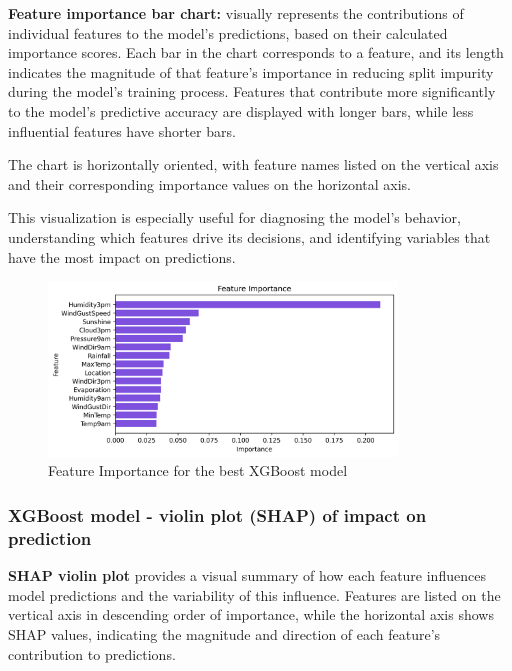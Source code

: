 \documentclass{article}%
\begin{document}
        \textbf{Feature importance bar chart:} visually represents the contributions of individual features to the model's predictions, 
        based on their calculated importance scores. Each bar in the chart corresponds to a feature, and its length indicates the magnitude of 
        that feature's importance in reducing split impurity during the model's training process. Features that contribute more significantly to 
        the model's predictive accuracy are displayed with longer bars, while less influential features have shorter bars.

        \hspace{20px}The chart is horizontally oriented, with feature names listed on the vertical axis and their corresponding importance values on the horizontal axis.

        \hspace{20px}This visualization is especially useful for diagnosing the model's behavior, understanding which features drive its decisions, 
        and identifying variables that have the most impact on predictions.\\
        \newline


\begin{figure}[h!]%
\centering%
\includegraphics[width=350px]{XAI/XGBoost/feature_importance.png}%
\caption{Feature Importance for the best XGBoost model}%
\end{figure}

%
\newpage%
\subsubsection{XGBoost model {-} violin plot (SHAP) of impact on prediction}%
\label{ssubsec:XGBoostmodel{-}violinplot(SHAP)ofimpactonprediction}%

        \textbf{SHAP violin plot} provides a visual summary of how each feature influences model predictions and the variability of this influence. 
        Features are listed on the vertical axis in descending order of importance, while the horizontal axis shows SHAP values, 
        indicating the magnitude and direction of each feature's contribution to predictions.
\end{document}
